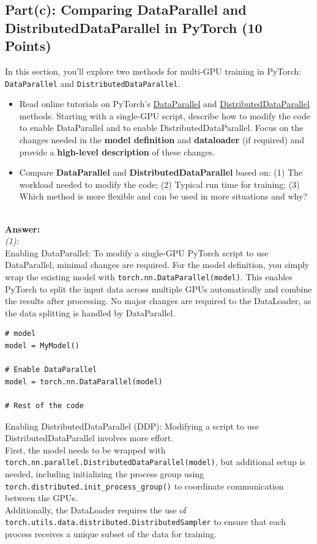 \documentclass[11pt, oneside]{article}   	%
\begin{document}
\newpage

\subsection*{Part(c): Comparing DataParallel and DistributedDataParallel in PyTorch (10 Points)}
In this section, you'll explore two methods for multi-GPU training in PyTorch: \texttt{DataParallel} and \texttt{DistributedDataParallel}.
\begin{itemize}
    \item Read online tutorials on PyTorch's \href{https://pytorch.org/docs/stable/generated/torch.nn.DataParallel.html}{DataParallel} and \href{https://pytorch.org/tutorials/intermediate/ddp_tutorial.html}{DistributedDataParallel} methods. Starting with a single-GPU script, describe how to modify the code to enable DataParallel and to enable DistributedDataParallel. Focus on the changes needed in the \textbf{model definition} and \textbf{dataloader} (if required) and provide a \textbf{high-level description} of these changes.
    \item Compare \textbf{DataParallel} and \textbf{DistributedDataParallel} based on:  (1) The workload needed to modify the code; (2) Typical run time for training; (3) Which method is more flexible and can be used in more situations and why?
\end{itemize}
\\
\textbf{Answer:}
\\
\textit{(1):} 
\\
Enabling DataParallel: To modify a single-GPU PyTorch script to use DataParallel, minimal changes are required. For the model definition, you simply wrap the existing model with \texttt{torch.nn.DataParallel(model)}. This enables PyTorch to split the input data across multiple GPUs automatically and combine the results after processing. No major changes are required to the DataLoader, as the data splitting is handled by DataParallel.

\begin{verbatim}
# model
model = MyModel()

# Enable DataParallel
model = torch.nn.DataParallel(model)

# Rest of the code 
\end{verbatim}

Enabling DistributedDataParallel (DDP): Modifying a script to use DistributedDataParallel involves more effort. 
\\
First, the model needs to be wrapped with \texttt{torch.nn.parallel.DistributedDataParallel(model)}, but additional setup is needed, including initializing the process group using 
\\
\texttt{torch.distributed.init\_process\_group()} to coordinate communication between the GPUs. 
\\
Additionally, the DataLoader requires the use of \texttt{torch.utils.data.distributed.DistributedSampler} to ensure that each process receives a unique subset of the data for training.
\end{document}
